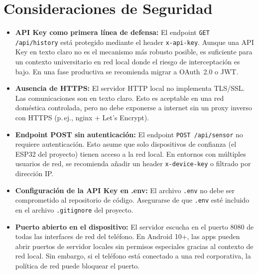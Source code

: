 \documentclass[12pt,a4paper]{article}
\begin{document}
\section{Consideraciones de Seguridad}

\begin{itemize}[leftmargin=2em]
  \item \textbf{API Key como primera línea de defensa:} El endpoint \texttt{GET /api/history}
        está protegido mediante el header \texttt{x-api-key}. Aunque una API Key en
        texto claro no es el mecanismo más robusto posible, es suficiente para un
        contexto universitario en red local donde el riesgo de interceptación es bajo.
        En una fase productiva se recomienda migrar a OAuth~2.0 o JWT.

  \item \textbf{Ausencia de HTTPS:} El servidor HTTP local no implementa TLS/SSL. Las
        comunicaciones son en texto claro. Esto es aceptable en una red doméstica
        controlada, pero no debe exponerse a internet sin un proxy inverso con HTTPS
        (p.\,ej., nginx + Let's Encrypt).

  \item \textbf{Endpoint POST sin autenticación:} El endpoint \texttt{POST /api/sensor}
        no requiere autenticación. Esto asume que solo dispositivos de confianza
        (el ESP32 del proyecto) tienen acceso a la red local. En entornos con múltiples
        usuarios de red, se recomienda añadir un header \texttt{x-device-key} o filtrado
        por dirección IP.

  \item \textbf{Configuración de la API Key en .env:} El archivo \texttt{.env} no debe
        ser comprometido al repositorio de código. Asegurarse de que
        \texttt{.env} esté incluido en el archivo \texttt{.gitignore} del proyecto.

  \item \textbf{Puerto abierto en el dispositivo:} El servidor escucha en el puerto
        8080 de todas las interfaces de red del teléfono. En Android 10+, las apps
        pueden abrir puertos de servidor locales sin permisos especiales gracias al
        contexto de red local. Sin embargo, si el teléfono está conectado a una red
        corporativa, la política de red puede bloquear el puerto.
\end{itemize}
\end{document}
